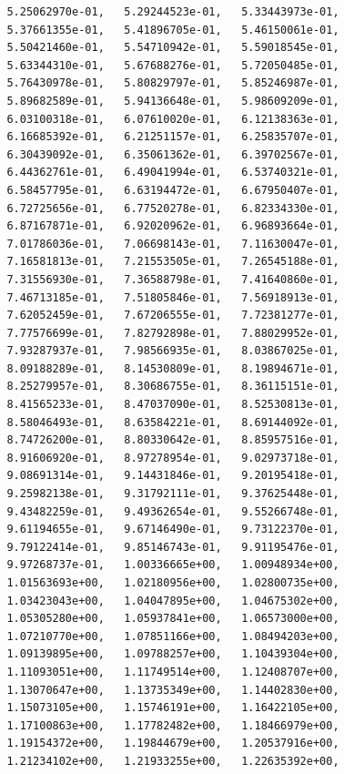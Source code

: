 \documentclass[11pt]{article}
\begin{document}
\begin{verbatim}
         5.25062970e-01,   5.29244523e-01,   5.33443973e-01,
         5.37661355e-01,   5.41896705e-01,   5.46150061e-01,
         5.50421460e-01,   5.54710942e-01,   5.59018545e-01,
         5.63344310e-01,   5.67688276e-01,   5.72050485e-01,
         5.76430978e-01,   5.80829797e-01,   5.85246987e-01,
         5.89682589e-01,   5.94136648e-01,   5.98609209e-01,
         6.03100318e-01,   6.07610020e-01,   6.12138363e-01,
         6.16685392e-01,   6.21251157e-01,   6.25835707e-01,
         6.30439092e-01,   6.35061362e-01,   6.39702567e-01,
         6.44362761e-01,   6.49041994e-01,   6.53740321e-01,
         6.58457795e-01,   6.63194472e-01,   6.67950407e-01,
         6.72725656e-01,   6.77520278e-01,   6.82334330e-01,
         6.87167871e-01,   6.92020962e-01,   6.96893664e-01,
         7.01786036e-01,   7.06698143e-01,   7.11630047e-01,
         7.16581813e-01,   7.21553505e-01,   7.26545188e-01,
         7.31556930e-01,   7.36588798e-01,   7.41640860e-01,
         7.46713185e-01,   7.51805846e-01,   7.56918913e-01,
         7.62052459e-01,   7.67206555e-01,   7.72381277e-01,
         7.77576699e-01,   7.82792898e-01,   7.88029952e-01,
         7.93287937e-01,   7.98566935e-01,   8.03867025e-01,
         8.09188289e-01,   8.14530809e-01,   8.19894671e-01,
         8.25279957e-01,   8.30686755e-01,   8.36115151e-01,
         8.41565233e-01,   8.47037090e-01,   8.52530813e-01,
         8.58046493e-01,   8.63584221e-01,   8.69144092e-01,
         8.74726200e-01,   8.80330642e-01,   8.85957516e-01,
         8.91606920e-01,   8.97278954e-01,   9.02973718e-01,
         9.08691314e-01,   9.14431846e-01,   9.20195418e-01,
         9.25982138e-01,   9.31792111e-01,   9.37625448e-01,
         9.43482259e-01,   9.49362654e-01,   9.55266748e-01,
         9.61194655e-01,   9.67146490e-01,   9.73122370e-01,
         9.79122414e-01,   9.85146743e-01,   9.91195476e-01,
         9.97268737e-01,   1.00336665e+00,   1.00948934e+00,
         1.01563693e+00,   1.02180956e+00,   1.02800735e+00,
         1.03423043e+00,   1.04047895e+00,   1.04675302e+00,
         1.05305280e+00,   1.05937841e+00,   1.06573000e+00,
         1.07210770e+00,   1.07851166e+00,   1.08494203e+00,
         1.09139895e+00,   1.09788257e+00,   1.10439304e+00,
         1.11093051e+00,   1.11749514e+00,   1.12408707e+00,
         1.13070647e+00,   1.13735349e+00,   1.14402830e+00,
         1.15073105e+00,   1.15746191e+00,   1.16422105e+00,
         1.17100863e+00,   1.17782482e+00,   1.18466979e+00,
         1.19154372e+00,   1.19844679e+00,   1.20537916e+00,
         1.21234102e+00,   1.21933255e+00,   1.22635392e+00,

\end{verbatim}
\end{document}
